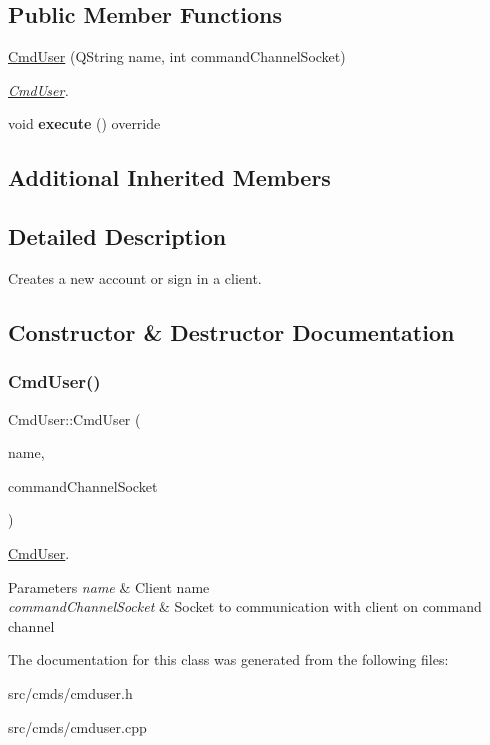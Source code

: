 \subsection*{Public Member Functions}
\begin{DoxyCompactItemize}
\item 
\hyperlink{classCmdUser_a97e1717dbed581a67d86de3102ba6933}{Cmd\+User} (Q\+String name, int command\+Channel\+Socket)
\begin{DoxyCompactList}\small\item\em \hyperlink{classCmdUser}{Cmd\+User}. \end{DoxyCompactList}\item 
\mbox{\label{classCmdUser_af23e5db7b5f2b3dcef89e26dba8f980c}} 
void {\bfseries execute} () override
\end{DoxyCompactItemize}
\subsection*{Additional Inherited Members}


\subsection{Detailed Description}
Creates a new account or sign in a client. 

\subsection{Constructor \& Destructor Documentation}
\mbox{\label{classCmdUser_a97e1717dbed581a67d86de3102ba6933}} 
\subsubsection{\texorpdfstring{Cmd\+User()}{CmdUser()}}
{\footnotesize\ttfamily Cmd\+User\+::\+Cmd\+User (\begin{DoxyParamCaption}\item[{Q\+String}]{name,  }\item[{int}]{command\+Channel\+Socket }\end{DoxyParamCaption})}



\hyperlink{classCmdUser}{Cmd\+User}. 


\begin{DoxyParams}{Parameters}
{\em name} & Client name \\
\hline
{\em command\+Channel\+Socket} & Socket to communication with client on command channel \\
\hline
\end{DoxyParams}


The documentation for this class was generated from the following files\+:\begin{DoxyCompactItemize}
\item 
src/cmds/cmduser.\+h\item 
src/cmds/cmduser.\+cpp\end{DoxyCompactItemize}
